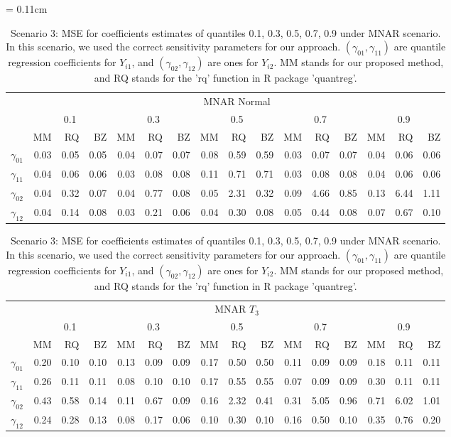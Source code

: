 \documentclass[12pt]{article}
\begin{document}
\begin{table}[h]
  \renewcommand{\arraystretch}{1.3}
  \centering
  \caption{Scenario 3: MSE for coefficients estimates of quantiles
    0.1, 0.3, 0.5, 0.7, 0.9 under MNAR scenario. In this scenario, we used the correct
    sensitivity parameters
    for our approach. $(\gamma_{01}, \gamma_{11})$
    are quantile regression coefficients for $Y_{i1}$, and $(\gamma_{02}, \gamma_{12})$
    are ones for $Y_{i2}$. MM stands for our proposed method, and RQ stands for the 'rq'
    function in R package 'quantreg'.} \label{tab:sim3}
  \vspace{10pt}
  \tabcolsep = 0.11cm
  \begin{tabular}{rrrrrrrrrrrrrrrr}
    \toprule
    & \multicolumn{15}{c}{MNAR Normal} \\
    \cline{2-16}
    &  \multicolumn{3}{c}{0.1} &  \multicolumn{3}{c}{0.3} &  \multicolumn{3}{c}{0.5} &
    \multicolumn{3}{c}{0.7} &  \multicolumn{3}{c}{0.9} \\
    \cline{2-16}
    & MM   & RQ   & BZ   & MM   & RQ   & BZ   & MM   & RQ   & BZ   & MM   & RQ   & BZ   & MM   & RQ   & BZ   \\
    \hline
    $\gamma_{01}$ & 0.03 & 0.05 & 0.05 & 0.04 & 0.07 & 0.07 & 0.08 & 0.59 & 0.59 & 0.03 & 0.07 & 0.07 & 0.04 & 0.06 & 0.06\\
    $\gamma_{11}$ & 0.04 & 0.06 & 0.06 & 0.03 & 0.08 & 0.08 & 0.11 & 0.71 & 0.71 & 0.03 & 0.08 & 0.08 & 0.04 & 0.06 & 0.06\\
    $\gamma_{02}$ & 0.04 & 0.32 & 0.07 & 0.04 & 0.77 & 0.08 & 0.05 & 2.31 & 0.32 & 0.09 & 4.66 & 0.85 & 0.13 & 6.44 & 1.11\\
    $\gamma_{12}$ & 0.04 & 0.14 & 0.08 & 0.03 & 0.21 & 0.06 & 0.04 & 0.30 & 0.08 & 0.05 & 0.44 & 0.08 & 0.07 & 0.67 & 0.10\\
    \bottomrule
  \end{tabular}
  \begin{tabular}{rrrrrrrrrrrrrrrr}
    \toprule
    & \multicolumn{15}{c}{MNAR $T_3$} \\
    \cline{2-16}
    &  \multicolumn{3}{c}{0.1} &  \multicolumn{3}{c}{0.3} &  \multicolumn{3}{c}{0.5} &
    \multicolumn{3}{c}{0.7} &  \multicolumn{3}{c}{0.9} \\
    \cline{2-16}
    & MM   & RQ   & BZ   & MM   & RQ   & BZ   & MM   & RQ   & BZ   & MM   & RQ   & BZ   & MM   & RQ   & BZ   \\
    \hline
    $\gamma_{01}$ & 0.20 & 0.10 & 0.10 & 0.13 & 0.09 & 0.09 & 0.17 & 0.50 & 0.50 & 0.11 & 0.09 & 0.09 & 0.18 & 0.11 & 0.11 \\
    $\gamma_{11}$ & 0.26 & 0.11 & 0.11 & 0.08 & 0.10 & 0.10 & 0.17 & 0.55 & 0.55 & 0.07 & 0.09 & 0.09 & 0.30 & 0.11 & 0.11 \\
    $\gamma_{02}$ & 0.43 & 0.58 & 0.14 & 0.11 & 0.67 & 0.09 & 0.16 & 2.32 & 0.41 & 0.31 & 5.05 & 0.96 & 0.71 & 6.02 & 1.01 \\
    $\gamma_{12}$ & 0.24 & 0.28 & 0.13 & 0.08 & 0.17 & 0.06 & 0.10 & 0.30 & 0.10 & 0.16 & 0.50 & 0.10 & 0.35 & 0.76 & 0.20 \\
    \bottomrule
  \end{tabular}


\end{table}
\end{document}
